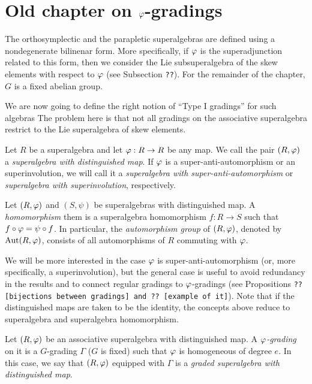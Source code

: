 \documentclass{amsbook}
\begin{document}
\chapter{Old chapter on $\varphi$-gradings}

The orthosymplectic and the parapletic superalgebras are defined using a nondegenerate bilinenar form. More specifically, if $\varphi$ is the superadjunction related to this form, then we consider the Lie subsuperalgebra of the skew elements with respect to $\varphi$ (see Subsection {\tt ??}). For the remainder of the chapter, $G$ is a fixed abelian group.

We are now going to define the right notion of ``Type I gradings'' for such algebras %
The problem here is that not all gradings on the associative superalgebra restrict to the Lie superalgebra of skew elements.

\begin{defi}
    Let $R$ be a superalgebra and let $\varphi: R\to R$ be any map. We call the pair $(R, \varphi)$ a \emph{superalgebra with distinguished map}. If $\varphi$ is a super-anti-automorphism or an superinvolution, we will call it a \emph{superalgebra with super-anti-automorphism} or \emph{superalgebra with superinvolution}, respectively.
\end{defi}

\begin{defi}
    Let $(R, \varphi)$ and $(S, \psi)$ be superalgebras with distinguished map. A \emph{homomorphism} them is a superalgebra homomorphism $f: R\to S$ such that $f\circ \varphi = \psi \circ f$. In particular, the \emph{automorphism group} of $(R, \varphi)$, denoted by $\operatorname{Aut}(R, \varphi)$, consists of all automorphisms of $R$ commuting with $\varphi$.
\end{defi}

We will be more interested in the case $\varphi$ is super-anti-automorphism (or, more specifically, a superinvolution), but the general case is useful to avoid redundancy in the results and to connect regular gradings to $\varphi$-gradings (see Propositions \texttt{?? [bijections between gradings]  and ?? [example of it]}). Note that if the distinguished maps are taken to be the identity, the concepts above reduce to superalgebra and superalgebra homomorphism. 

\begin{defi}
    Let $(R, \varphi)$ be an associative superalgebra with distinguished map. A \emph{$\varphi$-grading} on it is a $G$-grading $\Gamma$ ($G$ is fixed) such that $\varphi$ is homogeneous of degree $e$. In this case, we say that $(R, \varphi)$ equipped with $\Gamma$ is a \emph{graded superalgebra with distinguished map}.
\end{defi}
\end{document}
